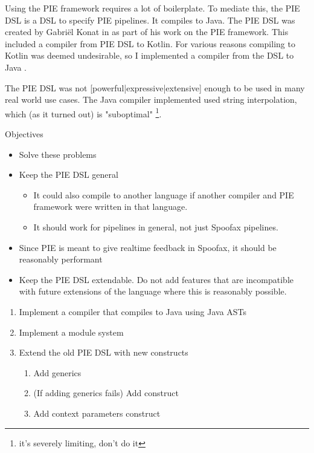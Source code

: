 
Using the PIE framework requires a lot of boilerplate.
To mediate this, the PIE DSL is a DSL to specify PIE pipelines.
It compiles to Java.
The PIE DSL was created by Gabriël Konat in  as part of his work on the PIE framework.
This included a compiler from PIE DSL to Kotlin.
For various reasons compiling to Kotlin was deemed undesirable, so I implemented a compiler from the DSL to Java .

The PIE DSL was not [powerful|expressive|extensive] enough to be used in many real world use cases.
The Java compiler implemented used string interpolation, which (as it turned out) is "suboptimal" \footnote{it's severely limiting, don't do it}.


Objectives
\begin{itemize}
  \item Solve these problems
  \item Keep the PIE DSL general
  \begin{itemize}
    \item It could also compile to another language if another compiler and PIE framework were written in that language.
    \item It should work for pipelines in general, not just Spoofax pipelines.
  \end{itemize}
  \item Since PIE is meant to give realtime feedback in Spoofax, it should be reasonably performant
  \item Keep the PIE DSL extendable. Do not add features that are incompatible with future extensions of the language where this is reasonably possible.
\end{itemize}

\begin{enumerate}
  \item Implement a compiler that compiles to Java using Java ASTs
  \item Implement a module system
  \item Extend the old PIE DSL with new constructs
  \begin{enumerate}
    \item Add generics
    \item (If adding generics fails) Add  construct
    \item Add context parameters construct
  \end{enumerate}
\end{enumerate}

